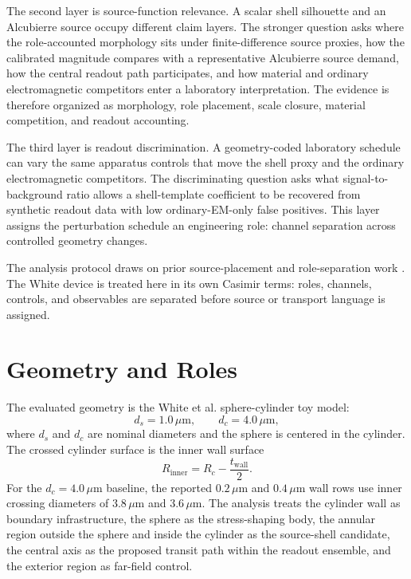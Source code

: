 \documentclass[11pt]{article}
\newcommand{\um}{\,\mu\mathrm{m}}
\begin{document}
The second layer is source-function relevance. A scalar shell silhouette and
an Alcubierre source occupy different claim layers. The stronger question asks
where the role-accounted morphology sits under finite-difference source
proxies, how the calibrated magnitude compares with a representative
Alcubierre source demand, how the central readout path participates, and how
material and ordinary electromagnetic competitors enter a laboratory
interpretation. The evidence is therefore organized as morphology, role
placement, scale closure, material competition, and readout accounting.

The third layer is readout discrimination. A geometry-coded laboratory schedule
can vary the same apparatus controls that move the shell proxy and the ordinary
electromagnetic competitors. The discriminating question asks what
signal-to-background ratio allows a shell-template coefficient to be recovered
from synthetic readout data with low ordinary-EM-only false positives. This
layer assigns the perturbation schedule an engineering role: channel separation
across controlled geometry changes.

The analysis protocol draws on prior source-placement and role-separation work
\cite{GoldmanRail2026,GoldmanDisclosure}. The White device is treated here in
its own Casimir terms: roles, channels, controls, and observables are separated
before source or transport language is assigned.

\section{Geometry and Roles}

The evaluated geometry is the White et al. sphere-cylinder toy model:
\begin{equation}
  d_s = 1.0\um,\qquad d_c = 4.0\um,
\end{equation}
where $d_s$ and $d_c$ are nominal diameters and the sphere is centered in the
cylinder. The crossed cylinder surface is the inner wall surface
\begin{equation}
  R_{\mathrm{inner}} = R_c - \frac{t_{\mathrm{wall}}}{2}.
\end{equation}
For the $d_c=4.0\um$ baseline, the reported $0.2\um$ and $0.4\um$ wall rows
use inner crossing diameters of $3.8\um$ and $3.6\um$. The analysis
treats the cylinder wall as boundary infrastructure, the sphere as the
stress-shaping body, the annular region outside the sphere and inside the
cylinder as the source-shell candidate, the central axis as the proposed
transit path within the readout ensemble, and the exterior region as far-field
control.
\end{document}
